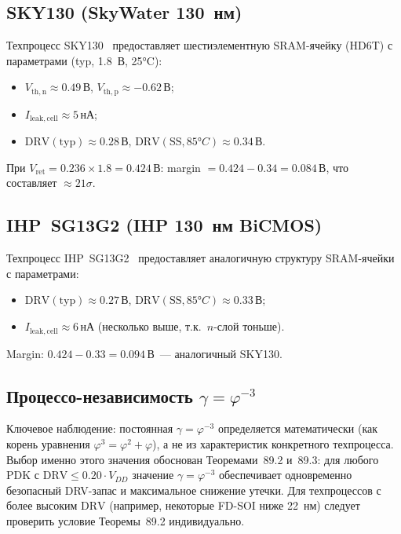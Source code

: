 \subsection{SKY130 (SkyWater 130~нм)}

Техпроцесс SKY130~\cite{SKY130-PDK} предоставляет
шестиэлементную SRAM-ячейку (HD6T) с параметрами
(typ, 1.8~В, 25°C):
%
\begin{itemize}
  \item $V_\mathrm{th,n} \approx 0.49\,\text{В}$,
        $V_\mathrm{th,p} \approx -0.62\,\text{В}$;
  \item $I_\mathrm{leak,cell} \approx 5\,\text{нА}$;
  \item $\mathrm{DRV}(\text{typ}) \approx 0.28\,\text{В}$,
        $\mathrm{DRV}(\text{SS}, 85°C) \approx 0.34\,\text{В}$.
\end{itemize}
%
При $V_\mathrm{ret} = 0.236 \times 1.8 = 0.424\,\text{В}$:
margin $= 0.424 - 0.34 = 0.084\,\text{В}$, что составляет $\approx 21\sigma$.

\subsection{IHP~SG13G2 (IHP 130~нм BiCMOS)}

Техпроцесс IHP~SG13G2~\cite{IHP-SG13G2} предоставляет
аналогичную структуру SRAM-ячейки с параметрами:
%
\begin{itemize}
  \item $\mathrm{DRV}(\text{typ}) \approx 0.27\,\text{В}$,
        $\mathrm{DRV}(\text{SS}, 85°C) \approx 0.33\,\text{В}$;
  \item $I_\mathrm{leak,cell} \approx 6\,\text{нА}$ (несколько выше,
        т.к.\ $n$-слой тоньше).
\end{itemize}
%
Margin: $0.424 - 0.33 = 0.094\,\text{В}$~--- аналогичный SKY130.

\subsection{Процессо-независимость $\gamma = \varphi^{-3}$}

Ключевое наблюдение: постоянная $\gamma = \varphi^{-3}$ определяется
математически (как корень уравнения $\varphi^3 = \varphi^2 + \varphi$),
а не из характеристик конкретного техпроцесса.
Выбор именно этого значения обоснован Теоремами~89.2 и~89.3:
для любого PDK с $\mathrm{DRV} \leq 0.20 \cdot V_{DD}$
значение $\gamma = \varphi^{-3}$ обеспечивает одновременно
безопасный DRV-запас и максимальное снижение утечки.
Для техпроцессов с более высоким $\mathrm{DRV}$
(например, некоторые FD-SOI ниже 22~нм)
следует проверить условие Теоремы~89.2 индивидуально.

